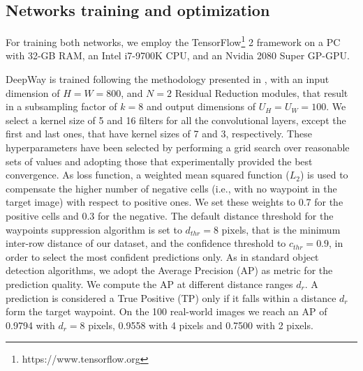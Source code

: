 \documentclass[journal]{IEEEtran}
\begin{document}
\subsection{Networks training and optimization}
For training both networks, we employ the TensorFlow\footnote{https://www.tensorflow.org} 2
framework on a PC with 32-GB RAM, an Intel i7-9700K CPU, and an Nvidia 2080 Super GP-GPU.

DeepWay is trained following the methodology presented in \cite{mazzia2021deepway}, with an input dimension of $H=W=800$, and $N=2$ Residual Reduction modules, that result in a subsampling factor of $k=8$ and output dimensions of $U_H=U_W=100$. We select a kernel size of 5 and 16 filters for all the convolutional layers, except the first and last ones, that have kernel sizes of 7 and 3, respectively. These hyperparameters have been selected by performing a grid search over reasonable sets of values and adopting those that experimentally provided the best convergence. As loss function, a weighted mean squared function ($L_2$) is used to compensate the higher number of negative cells (i.e., with no waypoint in the target image) with respect to positive ones. We set these weights to 0.7 for the positive cells and 0.3 for the negative. The default distance threshold for the waypoints suppression algorithm is set to $d_{thr} = 8$ pixels, that is the minimum inter-row distance of our dataset, and the confidence threshold to $c_{thr} = 0.9$, in order to select the most confident predictions only. As in standard object detection algorithms, we adopt the Average Precision (AP) as metric for the prediction quality. We compute the AP at different distance ranges $d_r$. A prediction is considered a True Positive (TP) only if it falls within a distance $d_r$ form the target waypoint. On the 100 real-world images we reach an AP of 0.9794 with $d_r = 8 $ pixels, 0.9558 with 4 pixels and
0.7500 with 2 pixels. 
\end{document}
